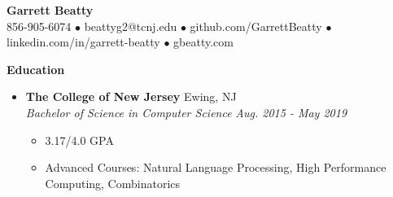 \documentclass[letterpaper,10pt]{article}
\newcommand{\resitem}[1]{\item #1 \vspace{-2pt}}
\newcommand{\resheading}[1]{{\large \colorbox{mygrey}{\begin{minipage}{\textwidth}{\textbf{#1 \vphantom{p\^{E}}}}\end{minipage}}}}
\newcommand{\ressubheading}[4]{%
  \item\textbf{#1} \hfill #2\null\\
  \textit{#3} \hfill \textit{#4}%
  \vspace{-5pt}
}%
\begin{document}
\begin{center}
\textbf{\Huge Garrett Beatty} \\
\vspace{0.05in}
856-905-6074 $\bullet$ beattyg2@tcnj.edu $\bullet$ github.com/GarrettBeatty $\bullet$ linkedin.com/in/garrett-beatty $\bullet$ gbeatty.com
\end{center}

\vspace{-0.05in}

\resheading{Education}
\begin{itemize}

\ressubheading{The College of New Jersey}{Ewing, NJ}{Bachelor of Science in Computer Science}{Aug. 2015 - May 2019}
	\begin{itemize}
		\resitem {3.17/4.0 GPA}
		\resitem{Advanced Courses: Natural Language Processing, High Performance Computing, Combinatorics}
	\end{itemize}
\end{itemize}
\end{document}
